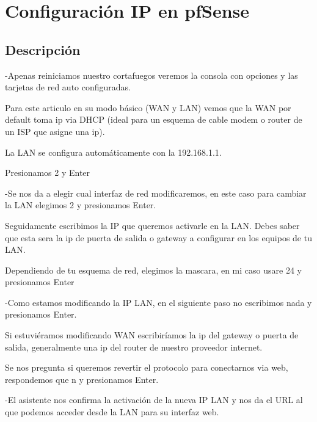 \documentclass[12pt,letterspaper]{report}
\begin{document}
\part{Configuración IP en pfSense}
\chapter*{Descripción}

-Apenas reiniciamos nuestro cortafuegos veremos la consola con opciones y las tarjetas de red auto configuradas.\par
\vspace {0.3cm}
Para este articulo en su modo básico (WAN y LAN) vemos que la WAN por default toma ip via DHCP (ideal para un esquema de cable modem o router de un ISP que asigne una ip).\par
\vspace {0.3cm}
La LAN se configura automáticamente con la 192.168.1.1.\par
\vspace {0.3cm}
Presionamos 2 y Enter\par
\vspace {0.3cm}
-Se nos da a elegir cual interfaz de red modificaremos, en este caso para cambiar la LAN elegimos 2 y presionamos Enter.\par
\vspace {0.3cm}
Seguidamente escribimos la IP que queremos activarle en la LAN.
\vspace {0.3cm}
Debes saber que esta sera la ip de puerta de salida o gateway a configurar en los equipos de tu LAN.\par
\vspace {0.3cm}
Dependiendo de tu esquema de red, elegimos la mascara, en mi caso usare 24 y presionamos Enter\par
\vspace {0.3cm}
-Como estamos modificando la IP LAN, en el siguiente paso no escribimos nada y presionamos Enter.\par
\vspace {0.3cm}
Si estuviéramos modificando WAN escribiríamos la ip del gateway o puerta de salida, generalmente una ip del router de nuestro proveedor internet.\par
\vspace {0.3cm}
Se nos pregunta si queremos revertir el protocolo para conectarnos via web, respondemos que n y presionamos Enter.\par
\vspace {0.3cm}
-El asistente nos confirma la activación de la nueva IP LAN y nos da el URL al que podemos acceder desde la LAN para su interfaz web.\par
\vspace {0.3cm}
\end{document}
